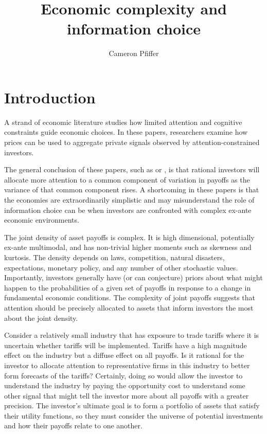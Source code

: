\documentclass{article}
\title{Economic complexity and information choice}
\author{Cameron Pfiffer}
\begin{document}
\newcommand{\Gauss}{\mathcal{N}}
\newcommand{\Var}{\text{Var}}
\newcommand{\E}{\text{E}}
\newcommand{\argmax}{\text{argmax}}

\newtheorem{definition}{Definition}
\newtheorem{lemma}{Lemma}


\newpage

\maketitle

\section{Introduction}

A strand of economic literature studies how limited attention and cognitive constraints guide economic choices. In these papers, researchers examine how prices can be used to aggregate private signals observed by attention-constrained investors. 

The general conclusion of these papers, such as \textcite{kacperczyk_rational_2016} or \textcite{peng_investor_2006}, is that rational investors will allocate more attention to a common component of variation in payoffs as the variance of that common component rises. A shortcoming in these papers is that the economies are extraordinarily simplistic and may misunderstand the role of information choice can be when investors are confronted with complex ex-ante economic environments.

The joint density of asset payoffs is complex. It is high dimensional, potentially ex-ante multimodal, and has non-trivial higher moments such as skewness and kurtosis. The density depends on laws, competition, natural disasters, expectations, monetary policy, and any number of other stochastic values. Importantly, investors generally have (or can conjecture) priors about what might happen to the probabilities of a given set of payoffs in response to a change in fundamental economic conditions. The complexity of joint payoffs suggests that attention should be precisely allocated to assets that inform investors the most about the joint density. 

Consider a relatively small industry that has exposure to trade tariffs where it is uncertain whether tariffs will be implemented. Tariffs have a high magnitude effect on the industry but a diffuse effect on all payoffs. Is it rational for the investor to allocate attention to representative firms in this industry to better form forecasts of the tariffs? Certainly, doing so would allow the investor to understand the industry by paying the opportunity cost to understand some other signal that might tell the investor more about all payoffs with a greater precision. The investor's ultimate goal is to form a portfolio of assets that satisfy their utility functions, so they must consider the universe of potential investments and how their payoffs relate to one another.
\end{document}
